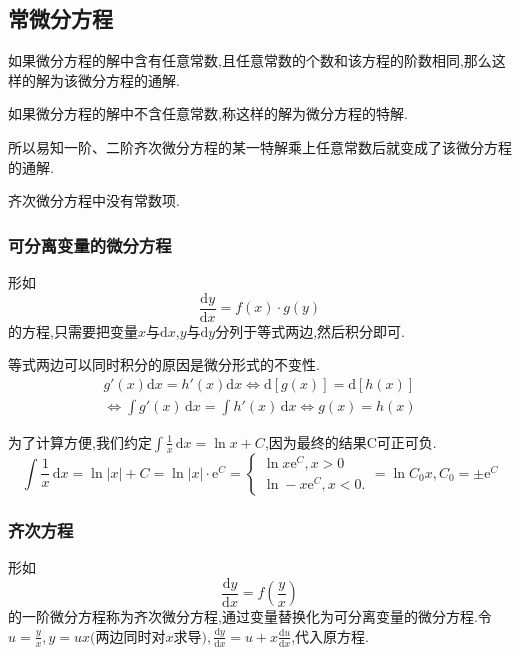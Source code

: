 \subsection{常微分方程}
如果微分方程的解中含有任意常数,且任意常数的个数和该方程的阶数相同,那么这样的解为该微分方程的通解.

如果微分方程的解中不含任意常数,称这样的解为微分方程的特解.

所以易知一阶、二阶齐次微分方程的某一特解乘上任意常数后就变成了该微分方程的通解.

齐次微分方程中没有常数项.
\subsubsection{可分离变量的微分方程}
形如
\begin{equation*}
    \frac{\mathrm{d} y}{\mathrm{d} x} =f(x)\cdot g(y)
\end{equation*}
的方程,只需要把变量$x$与$\mathrm{d} x$,$y$与$\mathrm{d} y$分列于等式两边,然后积分即可.

等式两边可以同时积分的原因是微分形式的不变性.
\begin{gather*}
    g'(x)\mathrm{d} x=h'(x)\mathrm{d} x \iff \mathrm{d} \left[ g(x) \right]=\mathrm{d} \left[ h(x) \right] \\
    \iff \int g'(x) \,\mathrm{d}x =\int h'(x) \,\mathrm{d}x \iff g(x)=h(x)
\end{gather*}

为了计算方便,我们约定$\int \frac{1}{x} \,\mathrm{d}x =\ln x+C$,因为最终的结果C可正可负.
\begin{equation*}
    \int \frac{1}{x} \,\mathrm{d}x =\ln \left\lvert x\right\rvert +C=\ln \left\lvert x\right\rvert \cdot\mathrm{e} ^C=
    \begin{cases}
        \ln x\mathrm{e}^C,x>0\\
        \ln -x \mathrm{e} ^C,x<0.
    \end{cases}=\ln C_0x,
    C_0=\pm \mathrm{e} ^C
\end{equation*}

\subsubsection{齐次方程}
形如
\begin{equation*}
    \frac{\mathrm{d} y}{\mathrm{d} x} =f\left(\frac{y}{x}\right) 
\end{equation*}
的一阶微分方程称为齐次微分方程,通过变量替换化为可分离变量的微分方程.令$u=\frac{y}{x},y=ux\text{(两边同时对$x$求导)},\frac{\mathrm{d} y}{\mathrm{d} x} = u+x \frac{\mathrm{d} u}{\mathrm{d} x} $,代入原方程.

